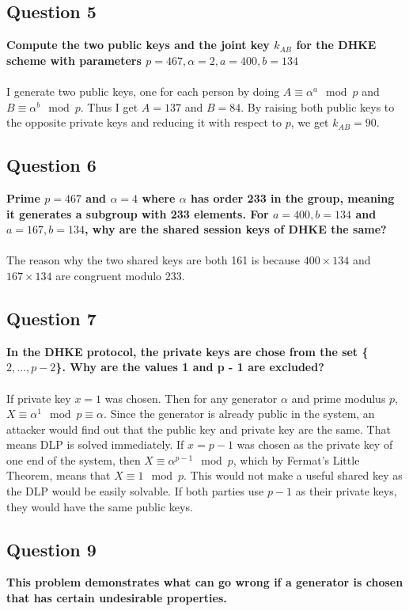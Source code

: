 \documentclass[titlepage]{article}
\begin{document}
{\subsection{Question 5}
{
\textbf{Compute the two public keys and the joint key \(k_{AB}\) for the DHKE scheme with parameters \(p = 467, \alpha = 2, a = 400, b = 134\)}\\\\
I generate two public keys, one for each person by doing \(A \equiv \alpha^a \mod p\) and \(B \equiv \alpha^b \mod p\). Thus I get \(A = 137\) and \(B = 84\). By raising both public keys to the opposite private keys and reducing it with respect to \(p\), we get \(k_{AB} = 90\).
}
\clearpage
\subsection{Question 6}
{
\textbf{Prime \(p = 467\) and \(\alpha = 4\) where \(\alpha\) has order 233 in the group, meaning it generates a subgroup with 233 elements. For \(a=400, b=134\) and \(a=167, b=134\), why are the shared session keys of DHKE the same?}\\\\The reason why the two shared keys are both 161 is because \(400 \times 134\) and \(167 \times 134\) are congruent modulo \(233\). 
}
\subsection{Question 7}
{
\textbf{In the DHKE protocol, the private keys are chose from the set \{\(2, \dots, p - 2\)\}. Why are the values 1 and p - 1 are excluded?}\\\\If private key \(x = 1\) was chosen. Then for any generator \(\alpha\) and prime modulus \(p\), \(X \equiv \alpha^1 \mod p \equiv \alpha\). Since the generator is already public in the system, an attacker would find out that the public key and private key are the same. That means DLP is solved immediately. If \(x = p - 1\) was chosen as the private key of one end of the system, then \(X \equiv \alpha^{p - 1} \mod p\), which by Fermat's Little Theorem, means that \(X \equiv 1 \mod p\). This would not make a useful shared key as the DLP would be easily solvable. If both parties use \(p - 1\) as their private keys, they would have the same public keys.  
}
\subsection{Question 9}
{
\textbf{This problem demonstrates what can go wrong if a generator is chosen that has certain undesirable properties.}
}}
\end{document}

